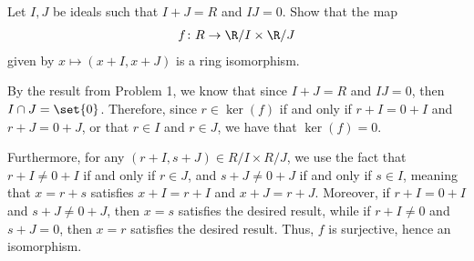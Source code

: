 \documentclass[10pt]{mypackage}
\begin{document}
\begin{problem}[Problem 7]
  Let $I,J$ be ideals such that $I + J = R$ and $IJ = 0$. Show that the map
  \begin{align*}
    f\colon R\rightarrow \R/I\times \R/J
  \end{align*}
  given by $x\mapsto \left( x+I,x+J \right)$ is a ring isomorphism.
\end{problem}
\begin{solution}
  By the result from Problem 1, we know that since $I + J = R$ and $IJ = 0$, then $I\cap J = \set{0}$. Therefore, since $r\in \ker\left( f \right)$ if and only if $r + I = 0 + I$ and $r + J = 0 + J$, or that $r\in I$ and $r\in J$, we have that $\ker\left( f \right) = 0$.\newline

  Furthermore, for any $\left( r+I,s+J \right)\in R/I\times R/J$, we use the fact that $r + I\neq 0 + I$ if and only if $r\in J$, and $s + J \neq 0 + J$ if and only if $s\in I$, meaning that $x = r + s$ satisfies $x + I = r + I$ and $x + J = r + J$. Moreover, if $r + I = 0 + I$ and $s + J \neq 0 + J$, then $x = s$ satisfies the desired result, while if $r + I \neq 0$ and $s + J = 0$, then $x = r$ satisfies the desired result. Thus, $f$ is surjective, hence an isomorphism.
\end{solution}
\end{document}
